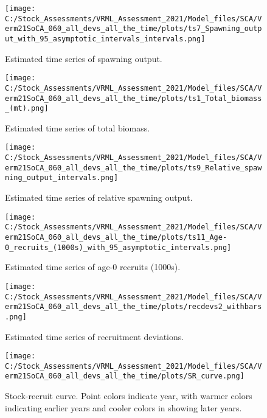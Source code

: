 \documentclass[11pt,
  english,
  a4paper,
]{article}
\begin{document}
\begin{figure}
\centering
\texttt{[image: C:/Stock\_Assessments/VRML\_Assessment\_2021/Model\_files/SCA/Verm21SoCA\_060\_all\_devs\_all\_the\_time/plots/ts7\_Spawning\_output\_with\_95\_asymptotic\_intervals\_intervals.png]}
\caption{Estimated time series of spawning output.\label{fig:ssb}}
\end{figure}

\begin{figure}
\centering
\texttt{[image: C:/Stock\_Assessments/VRML\_Assessment\_2021/Model\_files/SCA/Verm21SoCA\_060\_all\_devs\_all\_the\_time/plots/ts1\_Total\_biomass\_(mt).png]}
\caption{Estimated time series of total biomass.\label{fig:tot-bio}}
\end{figure}

\begin{figure}
\centering
\texttt{[image: C:/Stock\_Assessments/VRML\_Assessment\_2021/Model\_files/SCA/Verm21SoCA\_060\_all\_devs\_all\_the\_time/plots/ts9\_Relative\_spawning\_output\_intervals.png]}
\caption{Estimated time series of relative spawning output.\label{fig:depl}}
\end{figure}

\begin{figure}
\centering
\texttt{[image: C:/Stock\_Assessments/VRML\_Assessment\_2021/Model\_files/SCA/Verm21SoCA\_060\_all\_devs\_all\_the\_time/plots/ts11\_Age-0\_recruits\_(1000s)\_with\_95\_asymptotic\_intervals.png]}
\caption{Estimated time series of age-0 recruits (1000s).\label{fig:recruits}}
\end{figure}

\begin{figure}
\centering
\texttt{[image: C:/Stock\_Assessments/VRML\_Assessment\_2021/Model\_files/SCA/Verm21SoCA\_060\_all\_devs\_all\_the\_time/plots/recdevs2\_withbars.png]}
\caption{Estimated time series of recruitment deviations.\label{fig:rec-devs}}
\end{figure}

\begin{figure}
\centering
\texttt{[image: C:/Stock\_Assessments/VRML\_Assessment\_2021/Model\_files/SCA/Verm21SoCA\_060\_all\_devs\_all\_the\_time/plots/SR\_curve.png]}
\caption{Stock-recruit curve. Point colors indicate year, with warmer colors indicating earlier years and cooler colors in showing later years.\label{fig:bh-curve}}
\end{figure}
\end{document}
